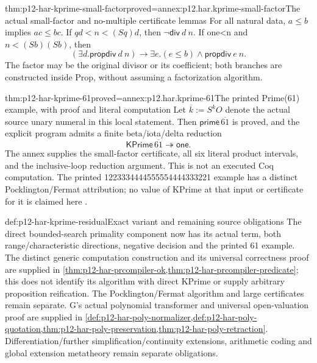 \begin{hblemma}{thm:p12-har-kprime-small-factor}{proved=annex:p12.har.kprime-small-factor}{The actual small-factor and no-multiple certificate lemmas}
For all natural data, \(a\le b\) implies \(ac\le bc\).
If \(qd<n<(S q)d\), then \(\neg\mathsf{div}\ d\ n\).
If one<n and \(n<(S b)(S b)\), then
\[
 (\exists d.\mathsf{propdiv}\ d\ n)\to
        \exists e.(e\le b)\wedge\mathsf{propdiv}\ e\ n.
\]
The factor may be the original divisor or its coefficient; both branches
are constructed inside Prop, without assuming a factorization algorithm.
\end{hblemma}

\begin{hbtheorem}{thm:p12-har-kprime-61}{proved=annex:p12.har.kprime-61}{The printed Prime(61) example, with proof and literal computation}
Let \(\overline{k}:=S^k O\) denote the actual source unary numeral in this
local statement. Then \(\mathsf{prime}\,\overline{61}\) is proved,
and the explicit program admits a finite beta/iota/delta reduction
\[
 \mathsf{KPrime}\,\overline{61}\twoheadrightarrow\mathsf{one}.
\]
The annex supplies the small-factor certificate, all six literal product
intervals, and the inclusive-loop reduction argument. This is not an
executed Coq computation. The printed
1223334444555554444333221 example has a distinct Pocklington/Fermat
attribution; no value of KPrime at that input or certificate for it is
claimed here \cite[pp.~1220,1223]{BarendregtGeuvers2001}.
\end{hbtheorem}

\begin{proofboundary}{def:p12-har-kprime-residual}{Exact variant and remaining source obligations}
The direct bounded-search primality component now has its actual term,
both range/characteristic directions, negative decision and the printed 61
example. The distinct generic computation construction and its universal
correctness proof are supplied in
\cref{thm:p12-har-prcompiler-ok,thm:p12-har-prcompiler-predicate}; this
does not identify its algorithm with direct KPrime or supply arbitrary
proposition reification. The Pocklington/Fermat algorithm and large
certificates remain separate. G's actual polynomial transformer and
universal open-valuation proof are supplied in
\cref{def:p12-har-poly-normalizer,def:p12-har-poly-quotation,thm:p12-har-poly-preservation,thm:p12-har-poly-retraction}.
Differentiation/further simplification/continuity extensions, arithmetic coding
and global extension metatheory remain separate obligations.
\end{proofboundary}
